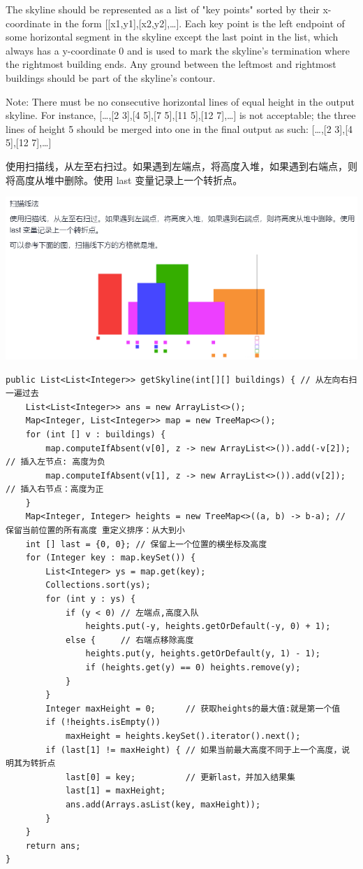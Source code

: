 \documentclass[9pt, b5paaper]{book}
\begin{document}
The skyline should be represented as a list of "key points" sorted by their x-coordinate in the form [[x1,y1],[x2,y2],\ldots{}]. Each key point is the left endpoint of some horizontal segment in the skyline except the last point in the list, which always has a y-coordinate 0 and is used to mark the skyline's termination where the rightmost building ends. Any ground between the leftmost and rightmost buildings should be part of the skyline's contour.

Note: There must be no consecutive horizontal lines of equal height in the output skyline. For instance, [\ldots{},[2 3],[4 5],[7 5],[11 5],[12 7],\ldots{}] is not acceptable; the three lines of height 5 should be merged into one in the final output as such: [\ldots{},[2 3],[4 5],[12 7],\ldots{}]

使用扫描线，从左至右扫过。如果遇到左端点，将高度入堆，如果遇到右端点，则将高度从堆中删除。使用 last 变量记录上一个转折点。

\includegraphics[width=.9\linewidth]{./pic/sweep.png}

\begin{verbatim}
public List<List<Integer>> getSkyline(int[][] buildings) { // 从左向右扫一遍过去
    List<List<Integer>> ans = new ArrayList<>();
    Map<Integer, List<Integer>> map = new TreeMap<>();
    for (int [] v : buildings) {
        map.computeIfAbsent(v[0], z -> new ArrayList<>()).add(-v[2]); // 插入左节点: 高度为负
        map.computeIfAbsent(v[1], z -> new ArrayList<>()).add(v[2]);  // 插入右节点：高度为正
    }
    Map<Integer, Integer> heights = new TreeMap<>((a, b) -> b-a); // 保留当前位置的所有高度 重定义排序：从大到小
    int [] last = {0, 0}; // 保留上一个位置的横坐标及高度           
    for (Integer key : map.keySet()) {
        List<Integer> ys = map.get(key);
        Collections.sort(ys);
        for (int y : ys) {
            if (y < 0) // 左端点,高度入队
                heights.put(-y, heights.getOrDefault(-y, 0) + 1);
            else {     // 右端点移除高度
                heights.put(y, heights.getOrDefault(y, 1) - 1);
                if (heights.get(y) == 0) heights.remove(y);
            }
        }
        Integer maxHeight = 0;      // 获取heights的最大值:就是第一个值
        if (!heights.isEmpty())
            maxHeight = heights.keySet().iterator().next();
        if (last[1] != maxHeight) { // 如果当前最大高度不同于上一个高度，说明其为转折点
            last[0] = key;          // 更新last，并加入结果集
            last[1] = maxHeight;
            ans.add(Arrays.asList(key, maxHeight));
        }
    }
    return ans;
}
\end{verbatim}
\end{document}
